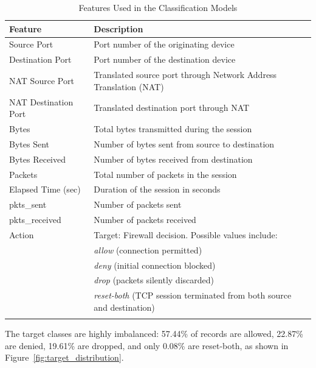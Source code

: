 \documentclass{article}      %
\begin{document}
\begin{table}[!h]
    \centering
    \caption{Features Used in the Classification Models}
    \small  %
    \begin{tabular}{lp{10cm}}
    \arrayrulecolor{black}  %
    \toprule
    \textbf{Feature} & \textbf{Description} \\
    \midrule
    \arrayrulecolor{lightgray}
    Source Port           & Port number of the originating device \\ \hline
    Destination Port      & Port number of the destination device \\ \hline
    NAT Source Port       & Translated source port through Network Address Translation (NAT) \\ \hline
    NAT Destination Port  & Translated destination port through NAT \\ \hline
    Bytes                 & Total bytes transmitted during the session \\ \hline
    Bytes Sent            & Number of bytes sent from source to destination \\ \hline
    Bytes Received        & Number of bytes received from destination \\ \hline
    Packets               & Total number of packets in the session \\ \hline
    Elapsed Time (sec)    & Duration of the session in seconds \\ \hline
    pkts\_sent            & Number of packets sent \\ \hline
    pkts\_received        & Number of packets received \\ \hline
    Action                & Target: Firewall decision.  Possible values include: \\
    & \textit{allow} (connection permitted) \\
    & \textit{deny} (initial connection blocked) \\
    & \textit{drop} (packets silently discarded) \\
    & \textit{reset-both} (TCP session terminated from both source and destination) \\   
    \arrayrulecolor{black}
    \bottomrule
    \end{tabular}
    \label{table:features}
\end{table}

The target classes are highly imbalanced: 57.44\% of records are allowed, 22.87\% are denied, 19.61\% are dropped, and only 0.08\% are reset-both, as shown in Figure~\ref{fig:target_distribution}.
\end{document}
